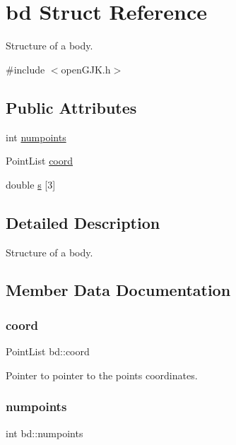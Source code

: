 \hypertarget{structbd}{}\section{bd Struct Reference}
\label{structbd}


Structure of a body.  




{\ttfamily \#include $<$open\+G\+J\+K.\+h$>$}

\subsection*{Public Attributes}
\begin{DoxyCompactItemize}
\item 
int \hyperlink{structbd_a6f759407140cf121dc9599ad816fd053}{numpoints}
\item 
Point\+List \hyperlink{structbd_a2fb85678380a2a1df58922af94cec6f3}{coord}
\item 
double \hyperlink{structbd_a68a6f689c5ced6af14d1c1dff58fa559}{s} \mbox{[}3\mbox{]}
\end{DoxyCompactItemize}


\subsection{Detailed Description}
Structure of a body. 

\subsection{Member Data Documentation}
\mbox{\label{structbd_a2fb85678380a2a1df58922af94cec6f3}} 
\subsubsection{\texorpdfstring{coord}{coord}}
{\footnotesize\ttfamily Point\+List bd\+::coord}

Pointer to pointer to the points\textquotesingle{} coordinates. \mbox{\label{structbd_a6f759407140cf121dc9599ad816fd053}} 
\subsubsection{\texorpdfstring{numpoints}{numpoints}}
{\footnotesize\ttfamily int bd\+::numpoints}

